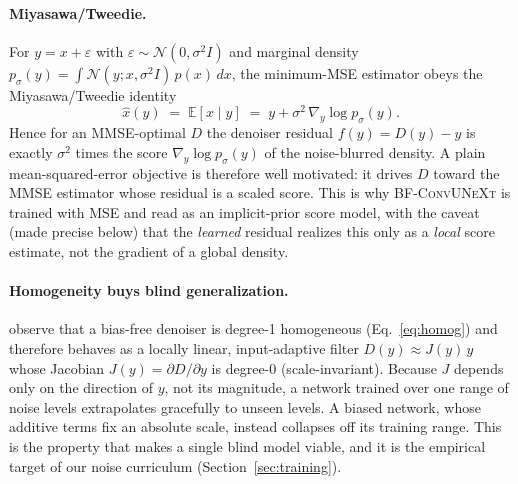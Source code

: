 \documentclass{article}
\newcommand{\E}{\mathbb{E}}
\newcommand{\model}{\textsc{BF-ConvUNeXt}}
\begin{document}
\paragraph{Miyasawa/Tweedie.}
For $y = x + \varepsilon$ with $\varepsilon \sim \mathcal{N}(0,\sigma^2 I)$ and marginal density $p_\sigma(y) = \int \mathcal{N}(y; x, \sigma^2 I)\, p(x)\, dx$, the minimum-MSE estimator obeys the Miyasawa/Tweedie identity
\begin{equation}
\hat{x}(y) \;=\; \E[x \mid y] \;=\; y + \sigma^2\, \nabla_y \log p_\sigma(y).
\label{eq:tweedie}
\end{equation}
Hence for an MMSE-optimal $D$ the denoiser residual $f(y) = D(y) - y$ is exactly $\sigma^2$ times the score $\nabla_y \log p_\sigma(y)$ of the noise-blurred density. A plain mean-squared-error objective is therefore well motivated: it drives $D$ toward the MMSE estimator whose residual is a scaled score. This is why \model{} is trained with MSE and read as an implicit-prior score model, with the caveat (made precise below) that the \emph{learned} residual realizes this only as a \emph{local} score estimate, not the gradient of a global density.

\paragraph{Homogeneity buys blind generalization.}
\citet{mohan2020biasfree} observe that a bias-free denoiser is degree-1 homogeneous (Eq.~\eqref{eq:homog}) and therefore behaves as a locally linear, input-adaptive filter $D(y) \approx J(y)\,y$ whose Jacobian $J(y)=\partial D/\partial y$ is degree-0 (scale-invariant). Because $J$ depends only on the direction of $y$, not its magnitude, a network trained over one range of noise levels extrapolates gracefully to unseen levels. A biased network, whose additive terms fix an absolute scale, instead collapses off its training range. This is the property that makes a single blind model viable, and it is the empirical target of our noise curriculum (Section~\ref{sec:training}).
\end{document}
